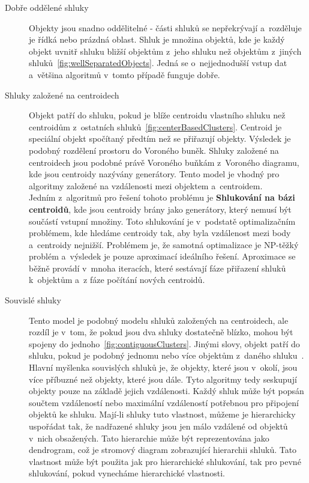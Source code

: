\begin{description}
\item[Dobře oddělené shluky] Objekty jsou snadno oddělitelné - části shluků se ne\-pře\-krý\-va\-jí a~rozděluje je řídká nebo prázdná oblast. Shluk je množina objektů, kde je každý objekt uvnitř shluku bližší objektům z~jeho shluku než objektům z~jiných shluků~\autoref{fig:wellSeparatedObjects}. Jedná se o~nejjednodušší vstup dat a~většina algoritmů v~tomto případě funguje dobře.

\item[Shluky založené na centroidech] Objekt patří do shluku, pokud je blíže centroidu vlastního shluku než centroidům z~ostatních shluků~\autoref{fig:centerBasedClusters}. Centroid je speciální objekt spočítaný předtím než se přiřazují objekty. Výsledek je podobný rozdělení prostoru do Voroného buněk. Shluky založené na centroidech jsou podobné právě Voroného buňkám z~Voroného diagramu, kde jsou centroidy nazývány generátory. Tento model je vhodný pro algoritmy založené na vzdálenosti mezi objektem a~centroidem.\\
Jedním z~algoritmů pro řešení tohoto problému je \textbf{Shlukování na bázi centroidů}, kde jsou centroidy brány jako generátory, který nemusí být součástí vstupní množiny. Toto shlukování je v~podstatě optimalizačním problémem, kde hledáme centroidy tak, aby byla vzdálenost mezi body a~centroidy nejnižší. Problémem je, že samotná optimalizace je NP-těžký problém a~výsledek je pouze aproximací ideálního řešení. Aproximace se běžně provádí v~mnoha iteracích, které sestávají fáze přiřazení shluků k~objektům a~z fáze počítání nových centroidů.

\item[Souvislé shluky] Tento model je podobný modelu shluků založených na centroidech, ale rozdíl je v~tom, že pokud jsou dva shluky dostatečně blízko, mohou být spojeny do jednoho~\autoref{fig:contiguousClusters}. Jinými slovy, objekt patří do shluku, pokud je podobný jednomu nebo více objektům z~daného shluku~\cite{Tan05}. \\
Hlavní myšlenka souvislých shluků je, že objekty, které jsou v~okolí, jsou více příbuzné než objekty, které jsou dále. Tyto algoritmy tedy seskupují objekty pouze na základě jejich vzdálenosti. Každý shluk může být popsán součtem vzdáleností nebo maximální vzdáleností potřebnou pro připojení objektů ke shluku. Mají-li shluky tuto vlastnost, můžeme je hierarchicky uspořádat tak, že nadřazené shluky jsou jen málo vzdálené od objektů v~nich obsažených. Tato hierarchie může být reprezentována jako dendrogram, což je stromový diagram zobrazující hierarchii shluků. Tato vlastnost může být použita jak pro hierarchické shlukování, tak pro pevné shlukování, pokud vynecháme hierarchické vlastnosti. \\


\end{description}
